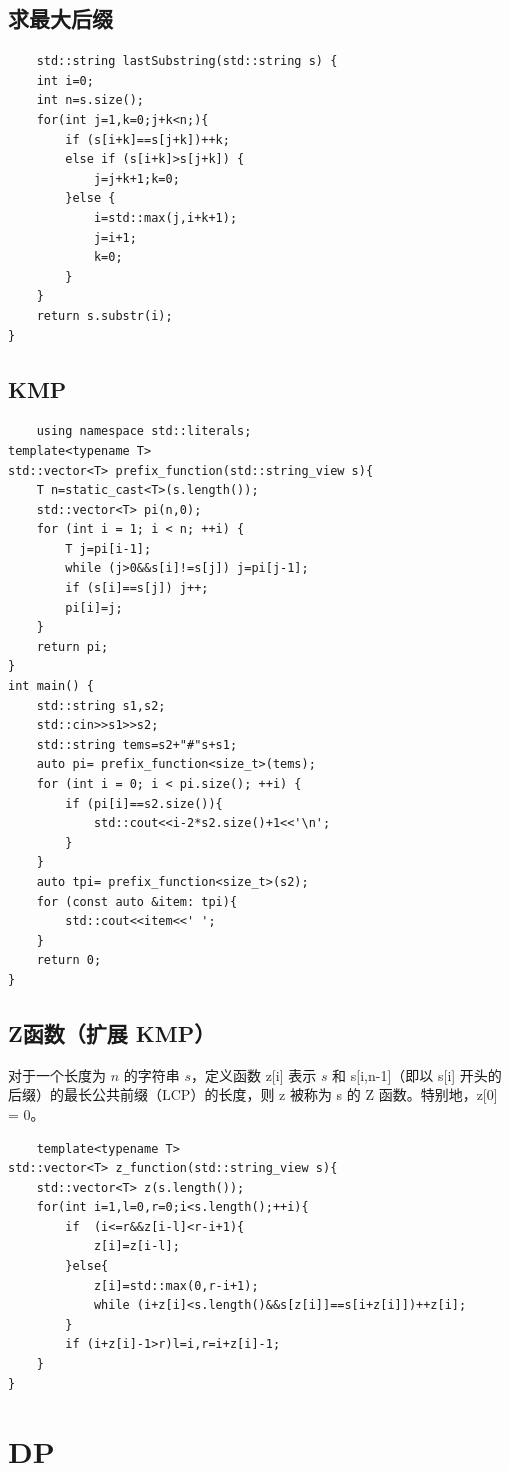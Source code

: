 \documentclass[UTF8,twoside]{ctexart}
\begin{document}
\subsection{求最大后缀}
\begin{lstlisting}
    std::string lastSubstring(std::string s) {
    int i=0;
    int n=s.size();
    for(int j=1,k=0;j+k<n;){
        if (s[i+k]==s[j+k])++k;
        else if (s[i+k]>s[j+k]) {
            j=j+k+1;k=0;
        }else {
            i=std::max(j,i+k+1);
            j=i+1;
            k=0;
        }
    }
    return s.substr(i);
}
\end{lstlisting}
\subsection{KMP}
\begin{lstlisting}
    using namespace std::literals;
template<typename T>
std::vector<T> prefix_function(std::string_view s){
    T n=static_cast<T>(s.length());
    std::vector<T> pi(n,0);
    for (int i = 1; i < n; ++i) {
        T j=pi[i-1];
        while (j>0&&s[i]!=s[j]) j=pi[j-1];
        if (s[i]==s[j]) j++;
        pi[i]=j;
    }
    return pi;
}
int main() {
    std::string s1,s2;
    std::cin>>s1>>s2;
    std::string tems=s2+"#"s+s1;
    auto pi= prefix_function<size_t>(tems);
    for (int i = 0; i < pi.size(); ++i) {
        if (pi[i]==s2.size()){
            std::cout<<i-2*s2.size()+1<<'\n';
        }
    }
    auto tpi= prefix_function<size_t>(s2);
    for (const auto &item: tpi){
        std::cout<<item<<' ';
    }
    return 0;
}
\end{lstlisting}
\subsection{Z函数（扩展 KMP）}
对于一个长度为 $n$ 的字符串 
$s$，定义函数 z[i] 表示 $s$ 和 s[i,n-1]（即以 s[i] 开头的后缀）的最长公共前缀（LCP）的长度，则 z 被称为 s 的 Z 函数。特别地，z[0] = 0。
\begin{lstlisting}
    template<typename T>
std::vector<T> z_function(std::string_view s){
    std::vector<T> z(s.length());
    for(int i=1,l=0,r=0;i<s.length();++i){
        if  (i<=r&&z[i-l]<r-i+1){
            z[i]=z[i-l];
        }else{
            z[i]=std::max(0,r-i+1);
            while (i+z[i]<s.length()&&s[z[i]]==s[i+z[i]])++z[i];
        }
        if (i+z[i]-1>r)l=i,r=i+z[i]-1;
    }
}
\end{lstlisting}
\section{DP}
\end{document}
